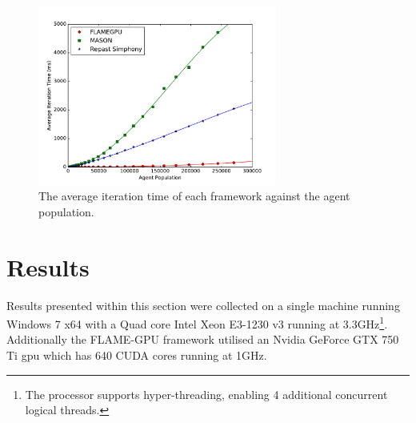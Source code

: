 \begin{figure}[tb]
\begin{center}
    \includegraphics[width=0.7\textwidth]{../resources/problemscale_graph/graph.pdf}
    \caption{\label{fig:graph-agent-pop}The average iteration time of each framework against the agent population.}
\end{center}
\vspace{-1cm}
\end{figure}
\vspace{-0.3cm}
\section{Results\label{sec:results}}
\vspace{-0.4cm}
  Results presented within this section were collected on a single machine running Windows 7 x64 with a Quad core Intel Xeon E3-1230 v3 running at 3.3GHz\footnote{The processor supports hyper-threading, enabling 4 additional concurrent logical threads.}. Additionally the FLAME-GPU framework utilised an Nvidia GeForce GTX 750 Ti \gls{gpu} which has 640 CUDA cores running at 1GHz.
  
